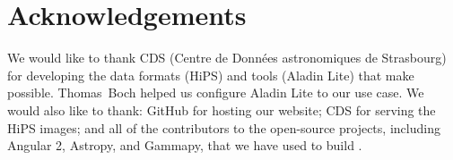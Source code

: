 \section{Acknowledgements}

We would like to thank CDS (Centre de Donn\'{e}es astronomiques de Strasbourg) for developing the data formats (HiPS) and tools (Aladin Lite) that make \gammasky possible. Thomas~Boch helped us configure Aladin Lite to our use case. We would also like to thank: GitHub for hosting our website; CDS for serving the HiPS images; and all of the contributors to the open-source projects, including Angular 2, Astropy, and Gammapy, that we have used to build \gammasky.
